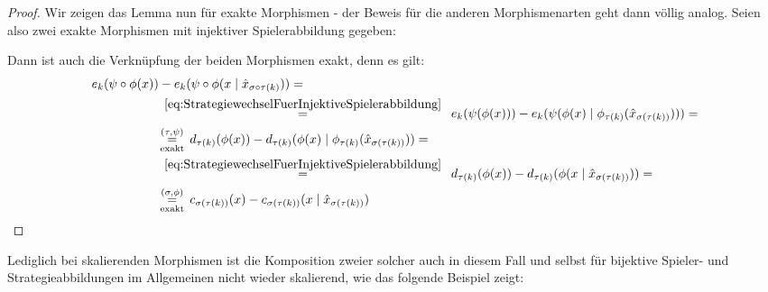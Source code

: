 \begin{proof}
	Wir zeigen das Lemma nun für exakte Morphismen - der Beweis für die anderen Morphismenarten geht dann völlig analog. Seien also zwei exakte Morphismen mit injektiver Spielerabbildung gegeben:
		\begin{center}\end{center}
	Dann ist auch die Verknüpfung der beiden Morphismen exakt, denn es gilt:
		\begin{align*}
			e_k(\psi\circ\phi(x)) &- e_k(\psi\circ\phi(x \mid \hat{x}_{\sigma\circ\tau(k)})) = \\
				&\,\overset{\eqref{eq:StrategiewechselFuerInjektiveSpielerabbildung}}{=}\,\,\,
					e_k(\psi(\phi(x))) - e_k(\psi(\phi(x) \mid \phi_{\tau(k)}(\hat{x}_{\sigma(\tau(k))}))) = \\
				&\!\underset{\text{exakt}}{\overset{(\tau, \psi)}{=}}\,
					d_{\tau(k)}(\phi(x)) - d_{\tau(k)}(\phi(x) \mid \phi_{\tau(k)}(\hat{x}_{\sigma(\tau(k))})) = \\
				&\,\overset{\eqref{eq:StrategiewechselFuerInjektiveSpielerabbildung}}{=}\,\,\, 
					d_{\tau(k)}(\phi(x)) - d_{\tau(k)}(\phi(x \mid \hat{x}_{\sigma(\tau(k))})) = \\
				&\!\underset{\text{exakt}}{\overset{(\sigma, \phi)}{=}}\, 
					c_{\sigma(\tau(k))}(x) - c_{\sigma(\tau(k))}(x \mid \hat{x}_{\sigma(\tau(k))})
				\qedhere
		\end{align*}
\end{proof}

Lediglich bei skalierenden Morphismen ist die Komposition zweier solcher auch in diesem Fall und selbst für bijektive Spieler- und Strategieabbildungen im Allgemeinen nicht wieder skalierend, wie das folgende Beispiel zeigt:


